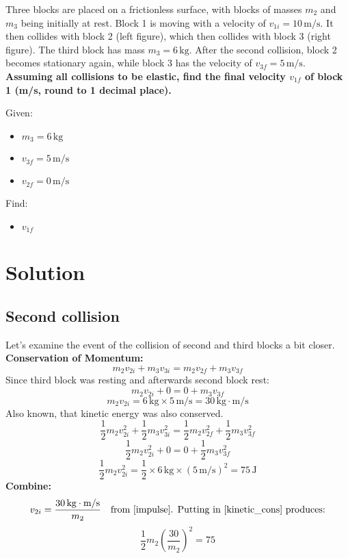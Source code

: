 Three blocks are placed on a frictionless surface, with blocks of masses $m_2$ and $m_3$ being initially at rest. Block 1 is moving with a velocity of $v_{1i} = 10 \, \text{m/s}$. It then collides with block 2 (left figure), which then collides with block 3 (right figure). The third block has mass $m_3 = 6 \, \text{kg}$. After the second collision, block 2 becomes stationary again, while block 3 has the velocity of $v_{3f} = 5 \, \text{m/s}$. 
\textbf{Assuming all collisions to be elastic, find the final velocity $v_{1f}$ of block 1 (m/s, round to 1 decimal place).}

\bigbreak Given:
\begin{itemize}
    \item \( m_3 = 6\,\text{kg} \)
    \item \( v_{3f} = 5\,\text{m/s} \)
    \item \( v_{2f} = 0\,\text{m/s} \)
\end{itemize}

\bigbreak Find:
\begin{itemize}
    \item $v_{1f}$
\end{itemize}

\section*{Solution} \subsection*{Second collision}
Let's examine the event of the collision of second and third blocks a bit closer.
\textbf{Conservation of Momentum:}
\[
m_2 v_{2i} + m_3 v_{3i} = m_2 v_{2f} + m_3 v_{3f}
\]
Since third block was resting and afterwards second block rest:
\[
m_2 v_{2i} + 0 = 0 + m_3 v_{3f}
\]
\begin{equation}
    m_2 v_{2i} = 6\,\text{kg} \times 5\,\text{m/s} = 30\,\text{kg}\cdot\text{m/s}
    \label{impulse}
\end{equation}
Also known, that kinetic energy was also conserved.
\[
\frac{1}{2} m_2 v_{2i}^2 + \frac{1}{2} m_3 v_{3i}^2 = \frac{1}{2} m_2 v_{2f}^2 + \frac{1}{2} m_3 v_{3f}^2
\]
\[
\frac{1}{2} m_2 v_{2i}^2 + 0 = 0 + \frac{1}{2} m_3 v_{3f}^2
\]
\begin{equation}
    \frac{1}{2} m_2 v_{2i}^2 = \frac{1}{2} \times 6\,\text{kg} \times (5\,\text{m/s})^2 = 75\,\text{J}
    \label{kinetic_cons}
\end{equation}
\textbf{Combine:}
\[
v_{2i} = \frac{30\,\text{kg}\cdot\text{m/s}}{{m_2}}
\quad \text{from \ref{impulse}. Putting in \ref{kinetic_cons} produces:}
\]
\[
\frac{1}{2} m_2 \left( \frac{30}{m_2} \right)^2 = 75
\]

